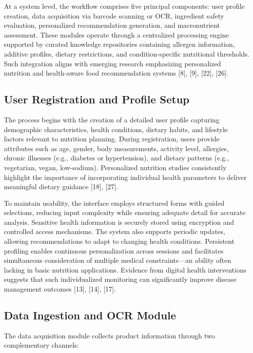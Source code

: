 \documentclass[conference]{IEEEtran}
\begin{document}
At a system level, the workflow comprises five principal components: user profile creation, data acquisition via barcode scanning or OCR, ingredient safety evaluation, personalized recommendation generation, and macronutrient assessment. These modules operate through a centralized processing engine supported by curated knowledge repositories containing allergen information, additive profiles, dietary restrictions, and condition-specific nutritional thresholds. Such integration aligns with emerging research emphasizing personalized nutrition and health-aware food recommendation systems [8], [9], [22], [26].

\subsection{User Registration and Profile Setup}

The process begins with the creation of a detailed user profile capturing demographic characteristics, health conditions, dietary habits, and lifestyle factors relevant to nutrition planning. During registration, users provide attributes such as age, gender, body measurements, activity level, allergies, chronic illnesses (e.g., diabetes or hypertension), and dietary patterns (e.g., vegetarian, vegan, low-sodium). Personalized nutrition studies consistently highlight the importance of incorporating individual health parameters to deliver meaningful dietary guidance [18], [27].

To maintain usability, the interface employs structured forms with guided selections, reducing input complexity while ensuring adequate detail for accurate analysis. Sensitive health information is securely stored using encryption and controlled access mechanisms. The system also supports periodic updates, allowing recommendations to adapt to changing health conditions. Persistent profiling enables continuous personalization across sessions and facilitates simultaneous consideration of multiple medical constraints—an ability often lacking in basic nutrition applications. Evidence from digital health interventions suggests that such individualized monitoring can significantly improve disease management outcomes [13], [14], [17].

\subsection{Data Ingestion and OCR Module}

The data acquisition module collects product information through two complementary channels:
\end{document}
